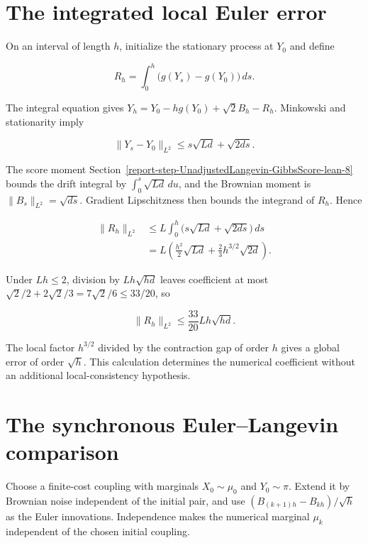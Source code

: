 \documentclass[11pt,a4paper]{report}
\begin{document}
\section{\texorpdfstring{The integrated local Euler error}{The integrated local Euler error}}



On an interval of length \(h\), initialize the stationary process at \(Y_0\) and define

\[R_h=\int_0^h\bigl(g(Y_s)-g(Y_0)\bigr)\,ds.\]

The integral equation gives \(Y_h=Y_0-hg(Y_0)+\sqrt2B_h-R_h\). Minkowski and stationarity imply

\[\|Y_s-Y_0\|_{L^2}\le s\sqrt{Ld}+\sqrt{2ds}.\]

The score moment Section~\ref{report-step-UnadjustedLangevin-GibbsScore-lean-8} bounds the drift integral by \(\int_0^s\sqrt{Ld}\,du\), and the Brownian moment is \(\|B_s\|_{L^2}=\sqrt{ds}\). Gradient Lipschitzness then bounds the integrand of \(R_h\). Hence

\[\begin{aligned}
\|R_h\|_{L^2}
&\le L\int_0^h\bigl(s\sqrt{Ld}+\sqrt{2ds}\bigr)\,ds\\
&=L\left(\frac{h^2}{2}\sqrt{Ld}+\frac23h^{3/2}\sqrt{2d}\right).
\end{aligned}\]

Under \(Lh\le2\), division by \(Lh\sqrt{hd}\) leaves coefficient at most \(\sqrt2/2+2\sqrt2/3=7\sqrt2/6\le33/20\), so

\[\|R_h\|_{L^2}\le\frac{33}{20}Lh\sqrt{hd}.\]

The local factor \(h^{3/2}\) divided by the contraction gap of order \(h\) gives a global error of order \(\sqrt h\). This calculation determines the numerical coefficient without an additional local-consistency hypothesis.


\section{\texorpdfstring{The synchronous Euler–Langevin comparison}{The synchronous Euler–Langevin comparison}}



Choose a finite-cost coupling with marginals \(X_0\sim\mu_0\) and \(Y_0\sim\pi\). Extend it by Brownian noise independent of the initial pair, and use \((B_{(k+1)h}-B_{kh})/\sqrt h\) as the Euler innovations. Independence makes the numerical marginal \(\mu_k\) independent of the chosen initial coupling.
\end{document}
